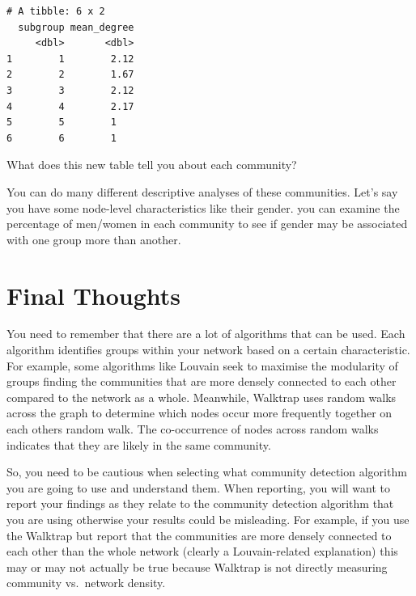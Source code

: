 \documentclass[
  letterpaper,
  DIV=11,
  numbers=noendperiod]{scrreprt}
\newenvironment{Shaded}{\begin{snugshade}}{\end{snugshade}}
\newcommand{\AttributeTok}[1]{\textcolor[rgb]{0.40,0.45,0.13}{#1}}
\newcommand{\ConstantTok}[1]{\textcolor[rgb]{0.56,0.35,0.01}{#1}}
\newcommand{\FunctionTok}[1]{\textcolor[rgb]{0.28,0.35,0.67}{#1}}
\newcommand{\NormalTok}[1]{\textcolor[rgb]{0.00,0.23,0.31}{#1}}
\newcommand{\OtherTok}[1]{\textcolor[rgb]{0.00,0.23,0.31}{#1}}
\newcommand{\SpecialCharTok}[1]{\textcolor[rgb]{0.37,0.37,0.37}{#1}}
\begin{document}
\begin{Shaded}
\end{Shaded}

\begin{verbatim}
# A tibble: 6 x 2
  subgroup mean_degree
     <dbl>       <dbl>
1        1        2.12
2        2        1.67
3        3        2.12
4        4        2.17
5        5        1   
6        6        1   
\end{verbatim}

What does this new table tell you about each community?

You can do many different descriptive analyses of these communities.
Let's say you have some node-level characteristics like their gender.
you can examine the percentage of men/women in each community to see if
gender may be associated with one group more than another.

\section{Final Thoughts}\label{final-thoughts}

You need to remember that there are a lot of algorithms that can be
used. Each algorithm identifies groups within your network based on a
certain characteristic. For example, some algorithms like Louvain seek
to maximise the modularity of groups finding the communities that are
more densely connected to each other compared to the network as a whole.
Meanwhile, Walktrap uses random walks across the graph to determine
which nodes occur more frequently together on each others random walk.
The co-occurrence of nodes across random walks indicates that they are
likely in the same community.

So, you need to be cautious when selecting what community detection
algorithm you are going to use and understand them. When reporting, you
will want to report your findings as they relate to the community
detection algorithm that you are using otherwise your results could be
misleading. For example, if you use the Walktrap but report that the
communities are more densely connected to each other than the whole
network (clearly a Louvain-related explanation) this may or may not
actually be true because Walktrap is not directly measuring community
vs.~network density.
\end{document}
